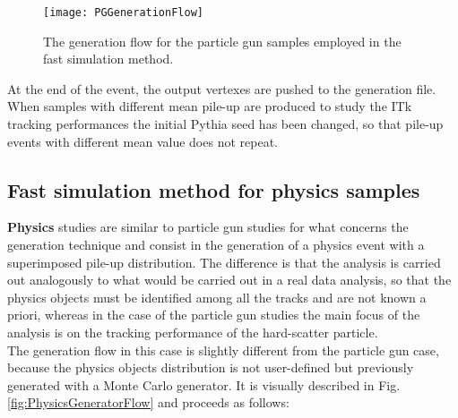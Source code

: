 \documentclass[a4paper,twoside,12pt]{article}
\begin{document}
\begin{figure} [h]
	\texttt{[image: PGGenerationFlow]}
	\caption{The generation flow for the particle gun samples employed in the fast 
	simulation method. }
	\label{fig:PGGenerationFlow}
\end{figure}

At the end of the event, the output vertexes are pushed to the generation file.\\

When samples with different mean pile-up are produced to study the ITk tracking
performances the initial Pythia seed has been changed, so that pile-up events with
different mean value does not repeat. \\

\subsection{Fast simulation method for physics samples}

\textbf{Physics} studies are similar to particle gun studies for what concerns the generation technique and 
consist in the generation of a physics event with a superimposed pile-up distribution. The
difference is that the analysis is carried out analogously to what would be carried out
in a real data analysis, so that the physics objects must be identified among all the tracks
and are not known a priori, whereas in the case of the particle gun studies the main focus
of the analysis is on the tracking performance of the hard-scatter particle.\\

The generation flow in this case is slightly different from the particle gun case, because 
the physics objects distribution is not user-defined but previously generated with a Monte
Carlo generator. It is visually described in Fig.\ref{fig:PhysicsGeneratorFlow} and proceeds as follows:\\
\end{document}

